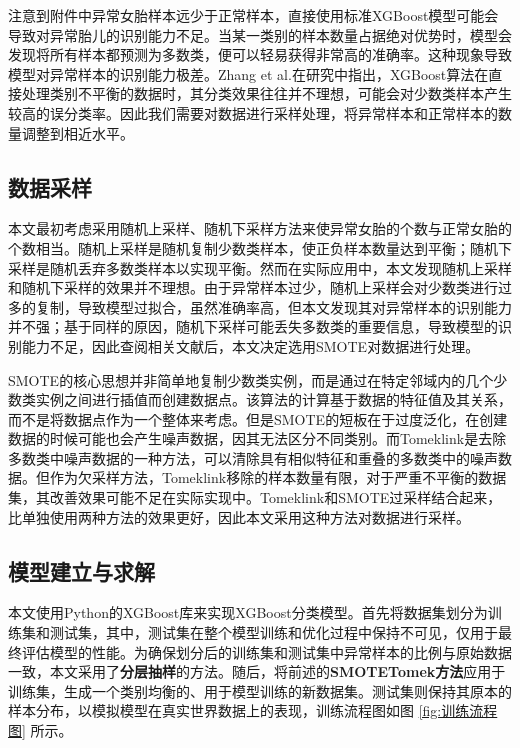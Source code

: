 注意到附件中异常女胎样本远少于正常样本，直接使用标准XGBoost模型可能会导致对异常胎儿的识别能力不足。当某一类别的样本数量占据绝对优势时，模型会发现将所有样本都预测为多数类，便可以轻易获得非常高的准确率。这种现象导致模型对异常样本的识别能力极差。Zhang et al.在研究中指出，XGBoost算法在直接处理类别不平衡的数据时，其分类效果往往并不理想，可能会对少数类样本产生较高的误分类率\cite{zhang2022research}。因此我们需要对数据进行采样处理，将异常样本和正常样本的数量调整到相近水平。

\subsection{数据采样}

本文最初考虑采用随机上采样、随机下采样方法来使异常女胎的个数与正常女胎的个数相当。随机上采样是随机复制少数类样本，使正负样本数量达到平衡；随机下采样是随机丢弃多数类样本以实现平衡。然而在实际应用中，本文发现随机上采样和随机下采样的效果并不理想。由于异常样本过少，随机上采样会对少数类进行过多的复制，导致模型过拟合，虽然准确率高，但本文发现其对异常样本的识别能力并不强；基于同样的原因，随机下采样可能丢失多数类的重要信息，导致模型的识别能力不足，因此查阅相关文献后，本文决定选用SMOTE\cite{DeepSeek_2}对数据进行处理。

SMOTE的核心思想并非简单地复制少数类实例，而是通过在特定邻域内的几个少数类实例之间进行插值而创建数据点。该算法的计算基于数据的特征值及其关系，而不是将数据点作为一个整体来考虑\cite{fernandez2018smote}。但是SMOTE的短板在于过度泛化，在创建数据的时候可能也会产生噪声数据，因其无法区分不同类别。而Tomeklink是去除多数类中噪声数据的一种方法，可以清除具有相似特征和重叠的多数类中的噪声数据。但作为欠采样方法，Tomeklink移除的样本数量有限，对于严重不平衡的数据集，其改善效果可能不足在实际实现中。Tomeklink和SMOTE过采样结合起来，比单独使用两种方法的效果更好\cite{hairani2023improvement}，因此本文采用这种方法对数据进行采样。

\subsection{模型建立与求解}
本文使用Python的XGBoost库来实现XGBoost分类模型。首先将数据集划分为训练集和测试集，其中，测试集在整个模型训练和优化过程中保持不可见，仅用于最终评估模型的性能。为确保划分后的训练集和测试集中异常样本的比例与原始数据一致，本文采用了\textbf{分层抽样}的方法。随后，将前述的\textbf{SMOTETomek方法}应用于训练集，生成一个类别均衡的、用于模型训练的新数据集。测试集则保持其原本的样本分布，以模拟模型在真实世界数据上的表现，训练流程图如图 \ref{fig:训练流程图} 所示。

